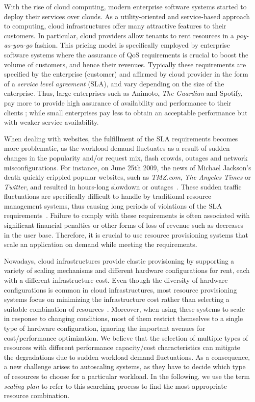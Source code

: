 With the rise of cloud computing, modern enterprise software systems
started to deploy their services over clouds. As a utility-oriented
and service-based approach to computing, cloud infrastructures offer
many attractive features to their customers.  In particular, cloud
providers allow tenants to rent resources in a \emph{pay-as-you-go}
fashion. This pricing model is specifically employed by enterprise
software systems where the assurance of QoS requirements is crucial to
boost the volume of customers, and hence their revenues. Typically
these requirements are specified by the enterprise (customer) and
affirmed by cloud provider in the form of a \emph{service level
agreement} (SLA), and vary depending on the size of the
enterprise. Thus, large enterprises such as Animoto, \emph{The
Guardian} and Spotify, pay more to provide high assurance of
availability and performance to their clients \cite{casestudiescloud};
while small enterprises pay less to obtain an acceptable performance
but with weaker service availability.


When dealing with websites, the fulfillment of the SLA requirements
becomes more problematic, as the workload demand fluctuates as a
result of sudden changes in the popularity and/or request mix, flash
crowds, outages and network misconfigurations.  For instance, on June
25th 2009, the news of Michael Jackson's death quickly crippled
popular websites, such as \emph{TMZ.com}, \emph{The Angeles Times}
or \emph{Twitter}, and resulted in hours-long slowdown or
outages~\cite{outagesTimes}. These sudden traffic fluctuations are
specifically difficult to handle by traditional resource management
systems, thus causing long periods of violations of the SLA
requirements~\cite{trafficCongestion}. Failure to comply with these
requirements is often associated with significant financial penalties
or other forms of loss of revenue such as decreases in the user base.
Therefore, it is crucial to use resource provisioning systems that
scale an application on demand while meeting the requirements.

Nowadays, cloud infrastructures provide elastic provisioning by
supporting a variety of scaling mechanisms and 
different hardware configurations for rent, each with a different
infrastructure cost. Even though the diversity of hardware
configurations is common in cloud infrastructures, most
resource provisioning systems focus on minimizing the infrastructure
cost rather than selecting a suitable combination of
resources~\cite{urgaonkar_agile_2008,dejavu2012}. Moreover,
when using these systems to scale in response to changing conditions,
most of them restrict themselves to a single type of hardware
configuration, ignoring the important avenues for cost/performance
optimization. We believe that the selection of multiple types of resources with
different performance capacity/cost characteristics can mitigate the
degradations due to sudden workload demand fluctuations. As a
consequence, a new challenge arises to autoscaling systems, as they
have to decide which type of resources to choose for a particular
workload. In the following, we use the term \emph{scaling plan} to
refer to this searching process to find the most appropriate resource
combination.

